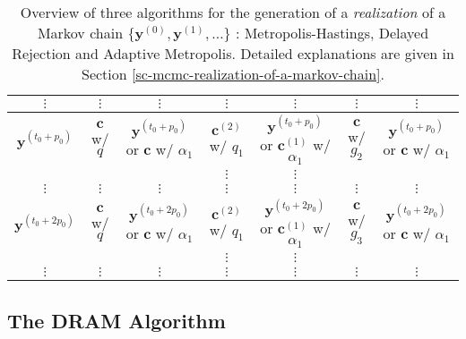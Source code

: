 \begin{sidewaystable}[h]
\begin{tabular}{|c||c|c||c|c||c|c|}
\hline
\hline
$\vdots$             & $\vdots$                & $\vdots$                                & $\vdots$               & $\vdots$                                        & $\vdots$         & $\vdots$                                \\
\hline
\hline
$\mathbf{y}^{(t_0+p_0)}$ & $\mathbf{c}$ w/ $q$              & $\mathbf{y}^{(t_0+p_0)}$ or $\mathbf{c}$ w/ $\alpha_1$ & $\mathbf{c}^{(2)}$ w/ $q_1$     & $\mathbf{y}^{(t_0+p_0)}$ or $\mathbf{c}^{(1)}$ w/ $\alpha_1$ & $\mathbf{c}$ w/ $g_2$     & $\mathbf{y}^{(t_0+p_0)}$ or $\mathbf{c}$ w/ $\alpha_1$ \\
\cline{4-5}
                     &                         &                                         & $\vdots$               & $\vdots$                                        &                  &                                         \\
\hline
\hline
$\vdots$             & $\vdots$                & $\vdots$                                & $\vdots$               & $\vdots$                                        & $\vdots$         & $\vdots$                                \\
\hline
\hline
$\mathbf{y}^{(t_0+2p_0)}$& $\mathbf{c}$ w/ $q$              & $\mathbf{y}^{(t_0+2p_0)}$ or $\mathbf{c}$ w/ $\alpha_1$& $\mathbf{c}^{(2)}$ w/ $q_1$     & $\mathbf{y}^{(t_0+2p_0)}$ or $\mathbf{c}^{(1)}$ w/ $\alpha_1$& $\mathbf{c}$ w/ $g_3$     & $\mathbf{y}^{(t_0+2p_0)}$ or $\mathbf{c}$ w/ $\alpha_1$\\
\cline{4-5}
                     &                         &                                         & $\vdots$               & $\vdots$                                        &                  &                                         \\
\hline
\hline
$\vdots$             & $\vdots$                & $\vdots$                                & $\vdots$               & $\vdots$                                        & $\vdots$         & $\vdots$                                \\
\hline
\end{tabular}
\caption{Overview of three algorithms for the generation of a {\it realization} of a Markov chain 
$\{\mathbf{y}^{(0)},\mathbf{y}^{(1)},\ldots\}$
: Metropolis-Hastings, Delayed Rejection and Adaptive Metropolis.
Detailed explanations are given in Section \ref{sc-mcmc-realization-of-a-markov-chain}.
}
\label{tab-dram}
\end{sidewaystable}

\subsection{The DRAM Algorithm}%
$~$\\

